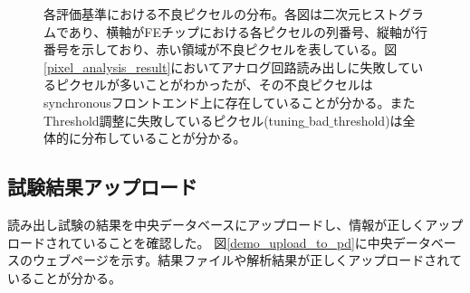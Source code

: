 \begin{figure}[bpt]
\caption[各評価基準における不良ピクセルの分布]{各評価基準における不良ピクセルの分布。各図は二次元ヒストグラムであり、横軸がFEチップにおける各ピクセルの列番号、縦軸が行番号を示しており、赤い領域が不良ピクセルを表している。図\ref{pixel_analysis_result}においてアナログ回路読み出しに失敗しているピクセルが多いことがわかったが、その不良ピクセルはsynchronousフロントエンド上に存在していることが分かる。またThreshold調整に失敗しているピクセル(tuning$\_$bad$\_$threshold)は全体的に分布していることが分かる。}
\label{pixel_analysis_result_dist}
\end{figure}

\subsection{試験結果アップロード}
読み出し試験の結果を中央データベースにアップロードし、情報が正しくアップロードされていることを確認した。
図\ref{demo_upload_to_pd}に中央データベースのウェブページを示す。結果ファイルや解析結果が正しくアップロードされていることが分かる。

